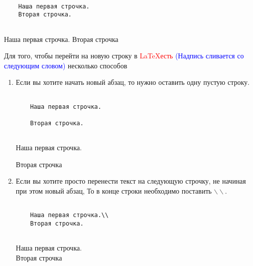     \begin{minipage}[h!]{0.5\linewidth}
    \begin{verbatim}
    
    Наша первая строчка.
    Вторая строчка.
    
    \end{verbatim}
    \end{minipage}
    \hfill
    \begin{minipage}[h!]{0.5\linewidth}
    Наша первая строчка.
    Вторая строчка
    \end{minipage}

    Для того, чтобы перейти на новую строку в \textcolor{Red}{\LaTeX есть} \textcolor{Blue}{(Надпись сливается со следующим словом)} несколько способов

    \begin{enumerate}
        \item Если вы хотите начать новый абзац, то нужно оставить одну пустую строку.

    \begin{minipage}[h!]{0.5\linewidth}
    \begin{verbatim}
    
    Наша первая строчка.

    Вторая строчка.
    
    \end{verbatim}
    \end{minipage}
    \hfill
    \begin{minipage}[h!]{0.5\linewidth}
    Наша первая строчка.

    Вторая строчка
    \end{minipage}

    \item Если вы хотите просто перенести текст на следующую строчку, не начиная при этом новый абзац, То
    в конце строки необходимо поставить $\backslash \backslash$.

    \begin{minipage}[h!]{0.5\linewidth}
    \begin{verbatim}
    
    Наша первая строчка.\\
    Вторая строчка.
    
    \end{verbatim}
    \end{minipage}
    \hfill
    \begin{minipage}[h!]{0.5\linewidth}
    Наша первая строчка.\\
    Вторая строчка
    \end{minipage}


\end{enumerate}
